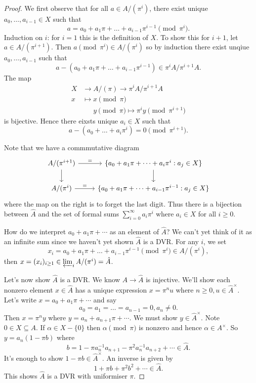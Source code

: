 \documentclass[a4paper]{article}
\begin{document}
\begin{proof}
  We first observe that for all \(a \in A/(\pi^i)\), there exist unique \(a_0, \dots, a_{i - 1} \in X\) such that
  \[
    a = a_0 + a_1 \pi + \dots + a_{i - 1} \pi^{i - 1} \pmod{\pi^i}.
  \]
  Induction on \(i\): for \(i = 1\) this is the definition of \(X\). To show this for \(i + 1\), let \(a \in A/(\pi^{i + 1})\). Then \(a \pmod{\pi^i} \in A/(\pi^i)\) so by induction there exist unqiue \(a_0, \dots, a_{i - 1}\) such that
  \[
    a - (a_0 + a_1 \pi + \dots + a_{i - 1} \pi^{i - 1}) \in \pi^i A/ \pi^{i + 1}A.
  \]
  The map
  \begin{align*}
    X &\to A/(\pi) \to \pi^iA/\pi^{i + 1}A \\
    x &\mapsto x \pmod \pi \\
    &\phantom{\to} y \pmod \pi \mapsto \pi^i y \pmod{\pi^{i + 1}}
  \end{align*}
  is bijective. Hence there eixsts unique \(a_i \in X\) such that
  \[
    a - (a_0 + \dots + a_i \pi^i) = 0 \pmod{\pi^{i + 1}}.
  \]

  Note that we have a commmutative diagram
  \[
    \begin{tikzcd}
      A/(\pi^{i + 1}) \ar[r, "="] \ar[d] & \{a_0 + a_1 \pi + \dots + a_i \pi^i: a_j \in X\} \ar[d] \\
      A/(\pi^i) \ar[r, "="] & \{a_0 + a_1 \pi + \dots + a_{i - 1} \pi^{i - 1}: a_j \in X\}
    \end{tikzcd}
  \]
  where the map on the right is to forget the last digit. Thus there is a bijection between \(\hat A\) and the set of formal sums \(\sum_{i = 0}^\infty a_i \pi^i\) where \(a_i \in X\) for all \(i \geq 0\).

  How do we interpret \(a_0 + a_1 \pi + \cdots\) as an element of \(\hat A\)? We can't yet think of it as an infinite sum since we haven't yet shown \(\hat A\) is a DVR. For any \(i\), we set
  \[
    x_ i = a_0 + a_1\pi + \dots + a_{i - 1}\pi^{i - 1} \pmod{\pi^i} \in A/(\pi^i),
  \]
  then \(x = (x_i)_{i \geq 1} \in \varprojlim_i A/(\pi^i) = \hat A\).

  Let's now show \(\hat A\) is a DVR. We know \(A \to \hat A\) is injective. We'll show each nonzero element \(x \in \hat A\) has a unique expression \(x = \pi^n u\) where \(n \geq 0, u \in \hat A^\times\). Let's write \(x = a_0 + a_1 \pi + \cdots\) and say
  \[
    a_0 = a_1 = \dots = a_{n - 1} = 0, a_n \neq 0.
  \]
  Then \(x = \pi^n y\) where \(y = a_n + a_{n + 1} \pi + \cdots\). We must show \(y \in \hat A^\times\). Note \(0 \in X \subseteq A\). If \(\alpha \in X - \{0\}\) then \(\alpha \pmod \pi\) is nonzero and hence \(\alpha \in A^\times\). So \(y = a_n(1 - \pi b)\) where
  \[
    b = 1 - \pi a_n^{-1} a_{n + 1} - \pi^2 a_n^{-1} a_{n + 2} + \cdots \in \hat A.
  \]
  It's enough to show \(1 - \pi b \in \hat A^\times\). An inverse is given by
  \[
    1 + \pi b + \pi^2 b^2 + \cdots \in \hat A.
  \]
  This shows \(\hat A\) is a DVR with uniformiser \(\pi\).


\end{proof}
\end{document}
